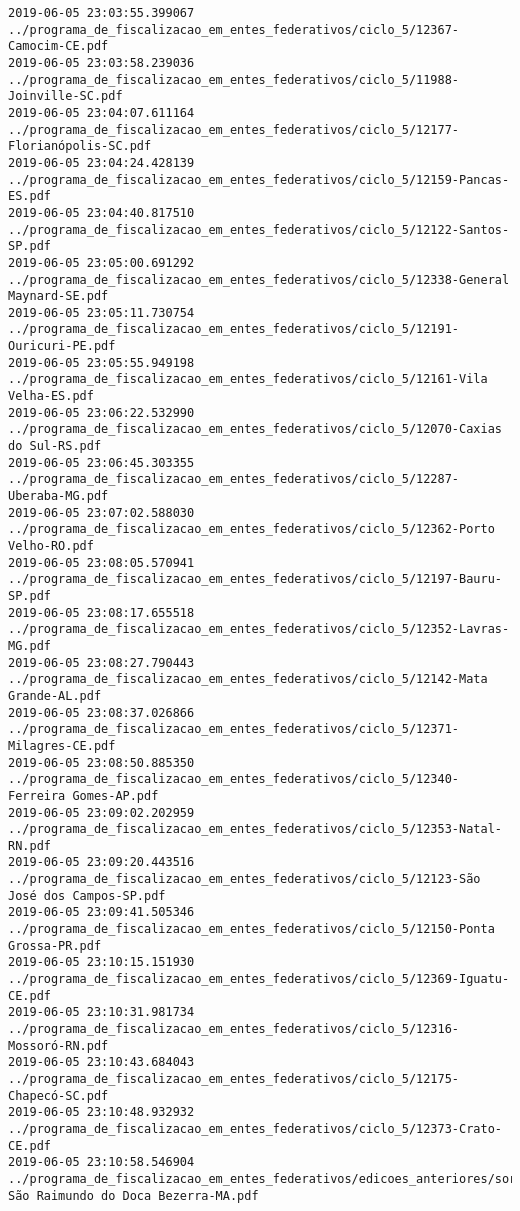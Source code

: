 \begin{lstlisting}
2019-06-05 23:03:55.399067 ../programa_de_fiscalizacao_em_entes_federativos/ciclo_5/12367-Camocim-CE.pdf
2019-06-05 23:03:58.239036 ../programa_de_fiscalizacao_em_entes_federativos/ciclo_5/11988-Joinville-SC.pdf
2019-06-05 23:04:07.611164 ../programa_de_fiscalizacao_em_entes_federativos/ciclo_5/12177-Florianópolis-SC.pdf
2019-06-05 23:04:24.428139 ../programa_de_fiscalizacao_em_entes_federativos/ciclo_5/12159-Pancas-ES.pdf
2019-06-05 23:04:40.817510 ../programa_de_fiscalizacao_em_entes_federativos/ciclo_5/12122-Santos-SP.pdf
2019-06-05 23:05:00.691292 ../programa_de_fiscalizacao_em_entes_federativos/ciclo_5/12338-General Maynard-SE.pdf
2019-06-05 23:05:11.730754 ../programa_de_fiscalizacao_em_entes_federativos/ciclo_5/12191-Ouricuri-PE.pdf
2019-06-05 23:05:55.949198 ../programa_de_fiscalizacao_em_entes_federativos/ciclo_5/12161-Vila Velha-ES.pdf
2019-06-05 23:06:22.532990 ../programa_de_fiscalizacao_em_entes_federativos/ciclo_5/12070-Caxias do Sul-RS.pdf
2019-06-05 23:06:45.303355 ../programa_de_fiscalizacao_em_entes_federativos/ciclo_5/12287-Uberaba-MG.pdf
2019-06-05 23:07:02.588030 ../programa_de_fiscalizacao_em_entes_federativos/ciclo_5/12362-Porto Velho-RO.pdf
2019-06-05 23:08:05.570941 ../programa_de_fiscalizacao_em_entes_federativos/ciclo_5/12197-Bauru-SP.pdf
2019-06-05 23:08:17.655518 ../programa_de_fiscalizacao_em_entes_federativos/ciclo_5/12352-Lavras-MG.pdf
2019-06-05 23:08:27.790443 ../programa_de_fiscalizacao_em_entes_federativos/ciclo_5/12142-Mata Grande-AL.pdf
2019-06-05 23:08:37.026866 ../programa_de_fiscalizacao_em_entes_federativos/ciclo_5/12371-Milagres-CE.pdf
2019-06-05 23:08:50.885350 ../programa_de_fiscalizacao_em_entes_federativos/ciclo_5/12340-Ferreira Gomes-AP.pdf
2019-06-05 23:09:02.202959 ../programa_de_fiscalizacao_em_entes_federativos/ciclo_5/12353-Natal-RN.pdf
2019-06-05 23:09:20.443516 ../programa_de_fiscalizacao_em_entes_federativos/ciclo_5/12123-São José dos Campos-SP.pdf
2019-06-05 23:09:41.505346 ../programa_de_fiscalizacao_em_entes_federativos/ciclo_5/12150-Ponta Grossa-PR.pdf
2019-06-05 23:10:15.151930 ../programa_de_fiscalizacao_em_entes_federativos/ciclo_5/12369-Iguatu-CE.pdf
2019-06-05 23:10:31.981734 ../programa_de_fiscalizacao_em_entes_federativos/ciclo_5/12316-Mossoró-RN.pdf
2019-06-05 23:10:43.684043 ../programa_de_fiscalizacao_em_entes_federativos/ciclo_5/12175-Chapecó-SC.pdf
2019-06-05 23:10:48.932932 ../programa_de_fiscalizacao_em_entes_federativos/ciclo_5/12373-Crato-CE.pdf
2019-06-05 23:10:58.546904 ../programa_de_fiscalizacao_em_entes_federativos/edicoes_anteriores/sorteio_34/1842-São Raimundo do Doca Bezerra-MA.pdf

\end{lstlisting}
